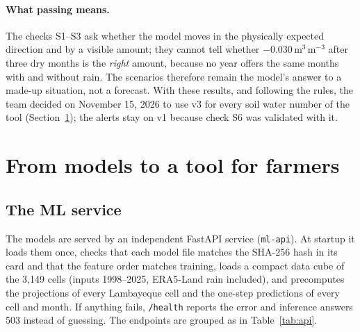 \documentclass[11pt,a4paper]{article}
\newcommand{\sm}{\ensuremath{\mathrm{m^3\,m^{-3}}}}
\begin{document}
\paragraph{What passing means.} The checks S1--S3 ask whether the model moves in the physically expected direction and by
a visible amount; they cannot tell whether $-0.030$\,\sm{} after three dry months is the \emph{right} amount, because no
year offers the same months with and without rain. The scenarios therefore remain the model's answer to a made-up
situation, not a forecast. With these results, and following the rules, the team decided on November 15, 2026 to use v3
for every soil water number of the tool (Section~\ref{sec:tool}); the alerts stay on v1 because check S6 was validated with it.

\section{From models to a tool for farmers}\label{sec:tool}

\subsection{The ML service}
The models are served by an independent FastAPI service (\texttt{ml-api}). At startup it loads them once, checks that each
model file matches the SHA-256 hash in its card and that the feature order matches training, loads a compact data cube of
the 3,149 cells (inputs 1998--2025, ERA5-Land rain included), and precomputes the projections of every Lambayeque cell
and the one-step predictions of every cell and month. If anything fails, \texttt{/health} reports the error and inference
answers 503 instead of guessing. The endpoints are grouped as in Table~\ref{tab:api}.
\end{document}
